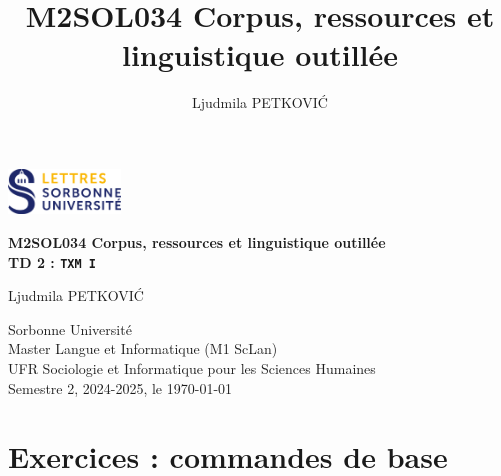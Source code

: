 \documentclass[xcolor={table,usenames,dvipsnames}]{article}
\author{Ljudmila PETKOVI\'C}
\title{\textbf{\textsc{M2SOL034} Corpus, ressources et linguistique outillée}}
\begin{document}
	
	\begin{center}
		\includegraphics[width=3cm]{img/logo.png} %
	\end{center}
	
	\begin{tcolorbox}[colback=myblue!10, colframe=myblue, width=\textwidth, sharp corners, boxrule=1pt]
		\centering
		\Large \textbf{\textsc{M2SOL034} Corpus, ressources et linguistique outillée\\{\large\textsc{TD 2} : \texttt{TXM I}}}
	\end{tcolorbox}
	
	\begin{center}
		Ljudmila PETKOVI\'C
		
		{\small Sorbonne Université\\Master \og{}Langue et Informatique\fg{} (\textsc{M1} ScLan)\\\textsc{UFR} Sociologie et Informatique pour les Sciences Humaines\\Semestre 2, 2024-2025, le \today}
	\end{center}
	


		
	\tableofcontents
	
	\bigskip
	
	\section{Exercices : commandes de base}  %
	
\end{document}
